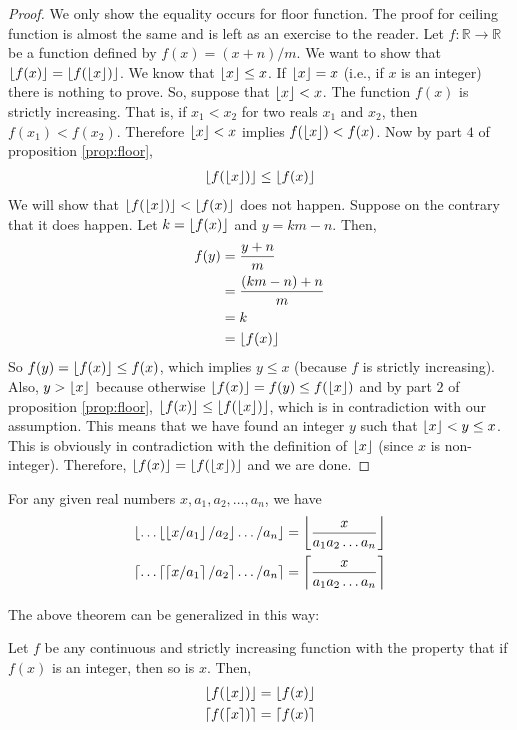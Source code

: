 \begin{proof}
We only show the equality occurs for floor function. The proof for ceiling function is almost the same and is left as an exercise to the reader. Let $f: \mathbb{R} \to \mathbb{R}$ be a function defined by $f(x)=(x+n)/m$. We want to show that $\left\lfloor{f(x)}\right\rfloor=\left\lfloor{f(\left\lfloor{x}\right\rfloor)}\right\rfloor$. We know that $\left\lfloor{x}\right\rfloor\leq x$. If $\left\lfloor{x}\right\rfloor = x$ (i.e., if $x$ is an integer) there is nothing to prove. So, suppose that $\left\lfloor{x}\right\rfloor< x$. The function $f(x)$ is strictly increasing. That is, if $x_1<x_2$ for two reals $x_1$ and $x_2$, then $f(x_1) < f(x_2)$. Therefore $\left\lfloor{x}\right\rfloor< x$ implies $f(\left\lfloor{x}\right\rfloor) < f(x)$. Now by part $4$ of proposition \ref{prop:floor},
\begin{align*}
	\left\lfloor{f(\left\lfloor{x}\right\rfloor)}\right\rfloor\leq \left\lfloor{f(x)}\right\rfloor
\end{align*}
We will show that $\left\lfloor{f(\left\lfloor{x}\right\rfloor)}\right\rfloor< \left\lfloor{f(x)}\right\rfloor$ does not happen. Suppose on the contrary that it does happen. Let $k = \left\lfloor{f(x)}\right\rfloor$ and $y=km-n$. Then,
\begin{align*}
	f(y) &= \dfrac{y+n}{m}\\
	&= \dfrac{(km-n)+n}{m}\\
	&= k\\
	&= \left\lfloor{f(x)}\right\rfloor
\end{align*}
So $f(y)=\left\lfloor{f(x)}\right\rfloor\leq f(x)$, which implies $y \leq x$ (because $f$ is strictly increasing). Also, $y > \left\lfloor{x}\right\rfloor$ because otherwise $\left\lfloor{f(x)}\right\rfloor= f(y) \leq  f(\left\lfloor{x}\right\rfloor)$ and by part $2$ of proposition \ref{prop:floor}, $\left\lfloor{f(x)}\right\rfloor\leq \left\lfloor{f(\left\lfloor{x}\right\rfloor)}\right\rfloor$, which is in contradiction with our assumption. This means that we have found an integer $y$ such that $\left\lfloor{x}\right\rfloor< y \leq x$. This is obviously in contradiction with the definition of $\left\lfloor{x}\right\rfloor$ (since $x$ is non-integer). Therefore, $\left\lfloor{f(x)}\right\rfloor= \left\lfloor{f(\left\lfloor{x}\right\rfloor)}\right\rfloor$ and we are done.
\end{proof}

\begin{corollary}
For any given real numbers $x, a_1, a_2, \ldots, a_n$, we have
\begin{align*}
	\left\lfloor{\ldots \left\lfloor{\left\lfloor{x/a_1}\right\rfloor /a_2}\right\rfloor\ldots/a_n}\right\rfloor
		&= \left\lfloor{\dfrac{x}{a_1a_2\ldots a_n}}\right\rfloor\\
	\left\lceil \ldots \left\lceil \left\lceil x/a_1 \right\rceil /a_2 \right\rceil  \ldots/a_n \right\rceil
		&= \left\lceil \dfrac{x}{a_1a_2\ldots a_n}\right\rceil
\end{align*}
\end{corollary}

The above theorem can be generalized in this way:
\begin{theorem}
Let $f$ be any continuous and strictly increasing function with the property that if $f(x)$ is an integer, then so is $x$. Then,
\begin{align*}
	\left\lfloor{f(\left\lfloor{x}\right\rfloor)}\right\rfloor
		& = \left\lfloor{f(x)}\right\rfloor\\
	\left\lceil f(\lceil x \rceil)\right\rceil
		& = \left\lceil f(x) \right\rceil
\end{align*}
\end{theorem}

